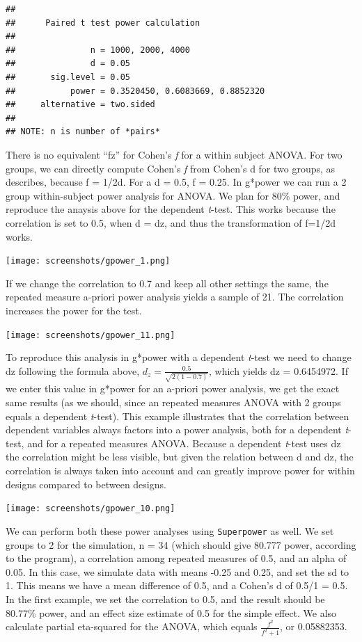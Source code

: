 \documentclass[
]{book}
\begin{document}
\begin{verbatim}
## 
##      Paired t test power calculation 
## 
##               n = 1000, 2000, 4000
##               d = 0.05
##       sig.level = 0.05
##           power = 0.3520450, 0.6083669, 0.8852320
##     alternative = two.sided
## 
## NOTE: n is number of *pairs*
\end{verbatim}

\newpage

There is no equivalent ``fz'' for Cohen's \emph{f} for a within subject ANOVA. For two groups, we can directly compute Cohen's \emph{f} from Cohen's d for two groups, as \citet{cohen1988spa} describes, because f = 1/2d. For a d = 0.5, f = 0.25. In g*power we can run a 2 group within-subject power analysis for ANOVA. We plan for 80\% power, and reproduce the anaysis above for the dependent \emph{t}-test. This works because the correlation is set to 0.5, when d = dz, and thus the transformation of f=1/2d works.

\texttt{[image: screenshots/gpower\_1.png]}

\newpage

If we change the correlation to 0.7 and keep all other settings the same, the repeated measure a-priori power analysis yields a sample of 21. The correlation increases the power for the test.

\texttt{[image: screenshots/gpower\_11.png]}

\newpage

To reproduce this analysis in g*power with a dependent \emph{t}-test we need to change dz following the formula above, \(d_{z}=\frac{0.5}{\sqrt{2(1-0.7)}}\), which yields dz = 0.6454972. If we enter this value in g*power for an a-priori power analysis, we get the exact same results (as we should, since an repeated measures ANOVA with 2 groups equals a dependent \emph{t}-test). This example illustrates that the correlation between dependent variables always factors into a power analysis, both for a dependent \emph{t}-test, and for a repeated measures ANOVA. Because a dependent \emph{t}-test uses dz the correlation might be less visible, but given the relation between d and dz, the correlation is always taken into account and can greatly improve power for within designs compared to between designs.

\texttt{[image: screenshots/gpower\_10.png]}

\newpage

We can perform both these power analyses using \texttt{Superpower} as well. We set groups to 2 for the simulation, n = 34 (which should give 80.777 power, according to the \citet{faul2007g} program), a correlation among repeated measures of 0.5, and an alpha of 0.05. In this case, we simulate data with means -0.25 and 0.25, and set the sd to 1. This means we have a mean difference of 0.5, and a Cohen's d of 0.5/1 = 0.5. In the first example, we set the correlation to 0.5, and the result should be 80.77\% power, and an effect size estimate of 0.5 for the simple effect. We also calculate partial eta-squared for the ANOVA, which equals \(\frac{f^2}{f^2+1}\), or 0.05882353.
\end{document}
